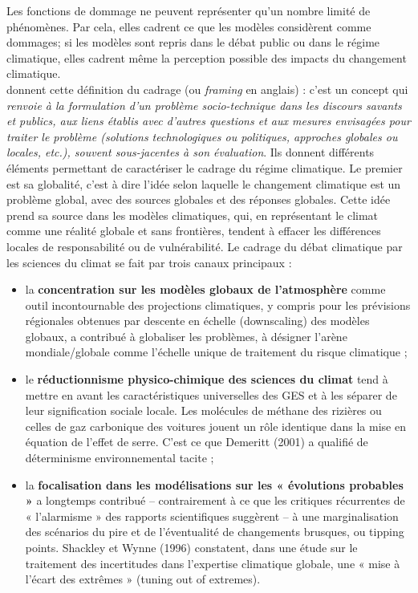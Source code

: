 Les fonctions de dommage ne peuvent représenter qu'un nombre limité de phénomènes. Par cela, elles cadrent ce que les modèles considèrent comme dommages; si les modèles sont repris dans le débat public ou dans le régime climatique, elles cadrent même la perception possible des impacts du changement climatique. \\

\textcite{aykut_gouverner_nodate} donnent cette définition du cadrage (ou \emph{framing} en anglais) : c'est un concept qui  \emph{renvoie à la formulation d’un problème socio-technique dans les discours savants et publics, aux liens établis avec d’autres questions et aux mesures envisagées pour traiter le problème (solutions technologiques ou politiques, approches globales ou locales, etc.), souvent sous-jacentes à son évaluation}. Ils donnent différents éléments permettant de caractériser le cadrage du régime climatique. Le premier est sa globalité, c'est à dire l'idée selon laquelle le changement climatique est un problème global, avec des sources globales et des réponses globales. Cette idée prend sa source dans les modèles climatiques, qui, en représentant le climat comme une réalité globale et sans frontières, tendent à effacer les différences locales de responsabilité ou de vulnérabilité. Le cadrage du débat climatique par les sciences du climat se fait par trois canaux principaux : 



\begin{authoredquote}
    \begin{itemize}
    \item la \textbf{concentration sur les modèles globaux de l’atmosphère} comme outil incontournable des projections climatiques, y compris pour les prévisions régionales obtenues par descente en échelle (downscaling) des modèles globaux, a contribué à globaliser les problèmes, à désigner l’arène mondiale/globale comme l’échelle unique de traitement du risque climatique ;
	\item le \textbf{réductionnisme physico-chimique des sciences du climat} tend à mettre en avant les caractéristiques universelles des GES et à les séparer de leur signification sociale locale. Les molécules de méthane des rizières ou celles de gaz carbonique des voitures jouent un rôle identique dans la mise en équation de l’effet de serre. C’est ce que Demeritt (2001) a qualifié de déterminisme environnemental tacite ;
	\item la \textbf{focalisation dans les modélisations sur les « évolutions probables »} a longtemps contribué – contrairement à ce que les critiques récurrentes de « l’alarmisme » des rapports scientifiques suggèrent – à une marginalisation des scénarios du pire et de l’éventualité de changements brusques, ou tipping points. Shackley et Wynne (1996) constatent, dans une étude sur le traitement des incertitudes dans l’expertise climatique globale, une « mise à l’écart des extrêmes » (tuning out of extremes).
\end{itemize}



\end{authoredquote}

